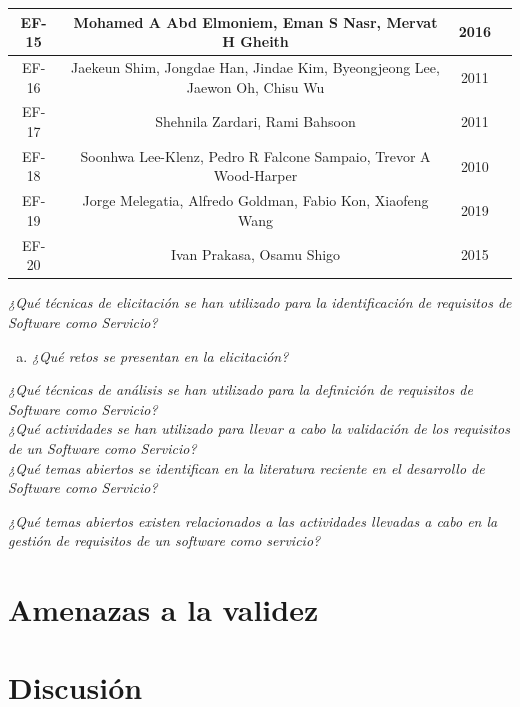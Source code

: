 \documentclass[conference,onecolumn,10pt]{IEEEtran}
\begin{document}
\begin{table}[!htbp]
{\begin{tabular}{c c c c}
                \hline 
                EF-15 & Mohamed A Abd Elmoniem, Eman S Nasr, Mervat H Gheith & 2016 & \cite{EF-15} \\
                \hline 
                EF-16 & Jaekeun Shim, Jongdae  Han, Jindae  Kim, Byeongjeong  Lee, Jaewon  Oh, Chisu  Wu  & 2011 & \cite{EF-16} \\
                \hline 
                EF-17 & Shehnila Zardari, Rami  Bahsoon & 2011 & \cite{EF-17} \\
                \hline 
                EF-18 & Soonhwa Lee-Klenz, Pedro R Falcone Sampaio, Trevor A Wood-Harper  & 2010 & \cite{EF-18} \\
                \hline 
                EF-19 & Jorge Melegatia, Alfredo Goldman, Fabio Kon, Xiaofeng Wang & 2019 & \cite{EF-19} \\
                \hline 
                EF-20 & Ivan Prakasa, Osamu Shigo & 2015 & \cite{EF-20} \\
                \hline 
        \end{tabular}}
        \label{table:tablaterminos}
\end{table}
\newpage

\emph{¿Qué técnicas de elicitación se han utilizado para la identificación de requisitos de Software como Servicio?}
  \begin{enumerate}[(a)]
  \item \emph{¿Qué retos se presentan en la elicitación?}
  \end{enumerate}

\emph{¿Qué técnicas de análisis se han utilizado para la definición de requisitos de Software como Servicio?}\\

\emph{¿Qué actividades se han utilizado para llevar a cabo la validación de los requisitos de un Software como Servicio?}\\

\emph{¿Qué temas abiertos se identifican en la literatura reciente en el desarrollo de Software como Servicio?}

\emph{¿Qué temas abiertos existen relacionados a las actividades llevadas a cabo en la gestión de requisitos de un software como servicio?}

\section{Amenazas a la validez}

\section{Discusión}
\end{document}
